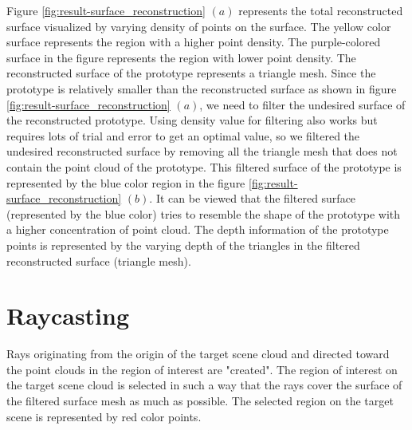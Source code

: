 Figure \ref{fig:result-surface_reconstruction} \((a)\) represents the total reconstructed surface visualized by varying density of points on the surface. The yellow color surface represents the region with a higher point density. The purple-colored surface in the figure represents the region with lower point density. The reconstructed surface of the prototype represents a triangle mesh. Since the prototype is relatively smaller than the reconstructed surface as shown in figure \ref{fig:result-surface_reconstruction} \((a)\), we need to filter the undesired surface of the reconstructed prototype. Using density value for filtering also works but requires lots of trial and error to get an optimal value, so we filtered the undesired reconstructed surface by removing all the triangle mesh that does not contain the point cloud of the prototype. This filtered surface of the prototype is represented by the blue color region in the figure \ref{fig:result-surface_reconstruction} \((b)\). It can be viewed that the filtered surface (represented by the blue color) tries to resemble the shape of the prototype with a higher concentration of point cloud. The depth information of the prototype points is represented by the varying depth of the triangles in the filtered reconstructed surface (triangle mesh).

\section{Raycasting}
Rays originating from the origin of the target scene cloud and directed toward the point clouds in the region of interest are "created". The region of interest on the target scene cloud is selected in such a way that the rays cover the surface of the filtered surface mesh as much as possible. The selected region on the target scene is represented by red color points.

